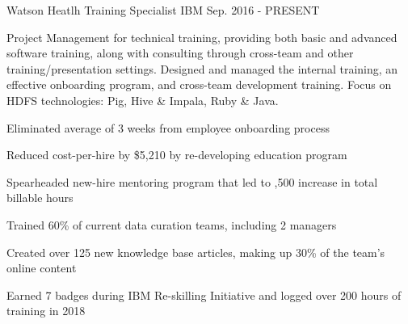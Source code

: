 

\begin{cventries}

  \cventry
    {Watson Heatlh} %
    {Training Specialist} %
    {IBM} %
    {Sep. 2016 - PRESENT} %
    {
      \begin{cvparagraph}
        Project Management for technical training, providing both basic and advanced software training, along with consulting through cross-team and other training/presentation settings.  Designed and managed the internal training, an effective onboarding program, and cross-team development training.  Focus on HDFS technologies: Pig, Hive \& Impala, Ruby \& Java.  
      \end{cvparagraph}
      \begin{cvitems} %
        \item {Eliminated average of 3 weeks from employee onboarding process}
        \item {Reduced cost-per-hire by \$5,210 by re-developing education program}
        \item {Spearheaded new-hire mentoring program that led to ,500 increase in total billable hours}
        \item {Trained 60\% of current data curation teams, including 2 managers}
        \item {Created over 125 new knowledge base articles, making up 30\% of the team's online content}
        \item {Earned 7 badges during IBM Re-skilling Initiative and logged over 200 hours of training in 2018}
      \end{cvitems}
    }


\end{cventries}
